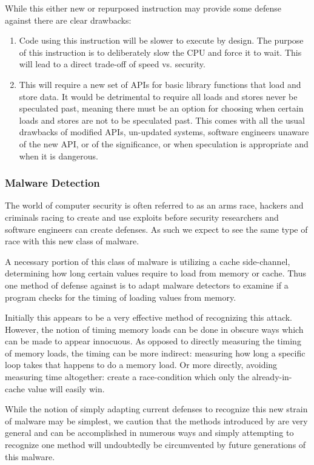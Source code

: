 While this either new or repurposed instruction may provide some defense
against \speculake there are clear drawbacks: 
\begin{enumerate}
    \item Code using this instruction will be slower to execute by design. The
    purpose of this instruction is to deliberately slow the CPU and force it to
    wait. This will lead to a direct trade-off of speed vs. security.

    \item This will require a new set of APIs for basic library functions that
    load and store data. It would be detrimental to require all loads and stores
    never be speculated past, meaning there must be an option for choosing when
    certain loads and stores are not to be speculated past. This comes with all
    the usual drawbacks of modified APIs, un-updated systems, software engineers
    unaware of the new API, or of the significance, or when speculation is
    appropriate and when it is dangerous.
\end{enumerate}

\subsubsection{Malware Detection}
The world of computer security is often referred to as an arms race, hackers and
criminals racing to create and use exploits before security researchers and
software engineers can create defenses. As such we expect to see the same type
of race with this new class of malware. 

A necessary portion of this class of malware is utilizing a cache side-channel,
determining how long certain values require to load from memory or cache. Thus
one method of defense against \speculake is to adapt malware detectors to
examine if a program checks for the timing of loading values from memory. 

Initially this appears to be a very effective method of recognizing this attack.
However, the notion of timing memory loads can be done in obscure ways which can
be made to appear innocuous. As opposed to directly measuring the timing of
memory loads, the timing can be more indirect: measuring how long a specific
loop takes that happens to do a memory load. Or more directly, avoiding
measuring time altogether: create a race-condition which only the
already-in-cache value will easily win.

While the notion of simply adapting current defenses to recognize this new
strain of malware may be simplest, we caution that the methods introduced by
\speculake are very general and can be accomplished in numerous ways and simply
attempting to recognize one method will undoubtedly be circumvented by future
generations of this malware.


